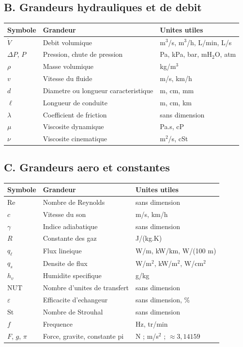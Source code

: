 \normalsize
\vspace{0.8em}
\subsection*{B. Grandeurs hydrauliques et de debit}
\small
\renewcommand{\arraystretch}{1.12}
\begin{tabularx}{\textwidth}{|l|X|X|}
\hline
\textbf{Symbole} & \textbf{Grandeur} & \textbf{Unites utiles} \\
\hline
$\dot{V}$ & Debit volumique & m$^3$/s, m$^3$/h, L/min, L/s \\
\hline
$\Delta P$, $P$ & Pression, chute de pression & Pa, kPa, bar, mH$_2$O, atm \\
\hline
$\rho$ & Masse volumique & kg/m$^3$ \\
\hline
$v$ & Vitesse du fluide & m/s, km/h \\
\hline
$d$ & Diametre ou longueur caracteristique & m, cm, mm \\
\hline
$\ell$ & Longueur de conduite & m, cm, km \\
\hline
$\lambda$ & Coefficient de friction & sans dimension \\
\hline
$\mu$ & Viscosite dynamique & Pa.s, cP \\
\hline
$\nu$ & Viscosite cinematique & m$^2$/s, cSt \\
\hline
\end{tabularx}

\normalsize
\vspace{0.8em}
\subsection*{C. Grandeurs aero et constantes}
\small
\renewcommand{\arraystretch}{1.12}
\begin{tabularx}{\textwidth}{|l|X|X|}
\hline
\textbf{Symbole} & \textbf{Grandeur} & \textbf{Unites utiles} \\
\hline
$\mathrm{Re}$ & Nombre de Reynolds & sans dimension \\
\hline
$c$ & Vitesse du son & m/s, km/h \\
\hline
$\gamma$ & Indice adiabatique & sans dimension \\
\hline
$R$ & Constante des gaz & J/(kg.K) \\
\hline
$q_{\ell}$ & Flux lineique & W/m, kW/km, W/(100 m) \\
\hline
$q_s$ & Densite de flux & W/m$^2$, kW/m$^2$, W/cm$^2$ \\
\hline
$h_v$ & Humidite specifique & g/kg \\
\hline
$\mathrm{NUT}$ & Nombre d'unites de transfert & sans dimension \\
\hline
$\varepsilon$ & Efficacite d'echangeur & sans dimension, \% \\
\hline
$\mathrm{St}$ & Nombre de Strouhal & sans dimension \\
\hline
$f$ & Frequence & Hz, tr/min \\
\hline
$F$, $g$, $\pi$ & Force, gravite, constante pi & N ; m/s$^2$ ; $\approx 3{,}14159$ \\
\hline
\end{tabularx}
\normalsize

